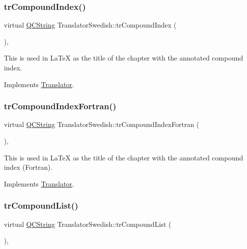 \subsubsection{\texorpdfstring{trCompoundIndex()}{trCompoundIndex()}}
{\footnotesize\ttfamily virtual \mbox{\hyperlink{class_q_c_string}{Q\+C\+String}} Translator\+Swedish\+::tr\+Compound\+Index (\begin{DoxyParamCaption}{ }\end{DoxyParamCaption})\hspace{0.3cm}{\ttfamily [inline]}, {\ttfamily [virtual]}}

This is used in La\+TeX as the title of the chapter with the annotated compound index. 

Implements \mbox{\hyperlink{class_translator}{Translator}}.

\mbox{\label{class_translator_swedish_a9e58c3e555f103fd2ab7d8e56ebf39e5}} 
\subsubsection{\texorpdfstring{trCompoundIndexFortran()}{trCompoundIndexFortran()}}
{\footnotesize\ttfamily virtual \mbox{\hyperlink{class_q_c_string}{Q\+C\+String}} Translator\+Swedish\+::tr\+Compound\+Index\+Fortran (\begin{DoxyParamCaption}{ }\end{DoxyParamCaption})\hspace{0.3cm}{\ttfamily [inline]}, {\ttfamily [virtual]}}

This is used in La\+TeX as the title of the chapter with the annotated compound index (Fortran). 

Implements \mbox{\hyperlink{class_translator}{Translator}}.

\mbox{\label{class_translator_swedish_a6e7c78fef0682a77fd99ac514ba999ef}} 
\subsubsection{\texorpdfstring{trCompoundList()}{trCompoundList()}}
{\footnotesize\ttfamily virtual \mbox{\hyperlink{class_q_c_string}{Q\+C\+String}} Translator\+Swedish\+::tr\+Compound\+List (\begin{DoxyParamCaption}{ }\end{DoxyParamCaption})\hspace{0.3cm}{\ttfamily [inline]}, {\ttfamily [virtual]}}

